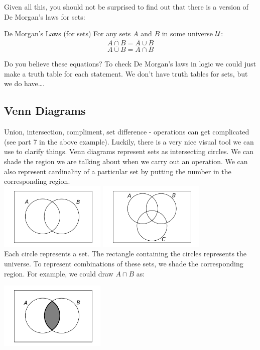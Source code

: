 \documentclass[12pt]{article}
\begin{document}
Given all this, you should not be surprised to find out that there is a version of De Morgan's laws for sets:

\begin{defbox}{De Morgan's Laws (for sets)}
  For any sets $A$ and $B$ in some universe $\mathcal U$:
  \[\bar{A \cap B} = \bar A \cup \bar B\]
  \[\bar{A \cup B} = \bar A \cap \bar B\]
\end{defbox}

Do you believe these equations?  To check De Morgan's laws in logic we could just make a truth table for each statement.  We don't have truth tables for sets, but we do have\ldots.

\subsection{Venn Diagrams}
Union, intersection, compliment, set difference - operations can get complicated (see part 7 in the above example).  Luckily, there is a very nice visual tool we can use to clarify things.  Venn diagrams represent sets as intersecting circles.  We can shade the region we are talking about when we carry out an operation.  We can also represent cardinality of a particular set by putting the number in the corresponding region.\\

\includegraphics[width=2in]{images/venn2blank.png} \hfill \includegraphics[width=2in]{images/venn3blank.png}\\

Each circle represents a set.  The rectangle containing the circles represents the universe.  To represent combinations of these sets, we shade the corresponding region.  For example, we could draw $A \cap B$ as:

\begin{center}
  \includegraphics[width=2in]{images/venn2AcapB.png} 
\end{center}
\end{document}
